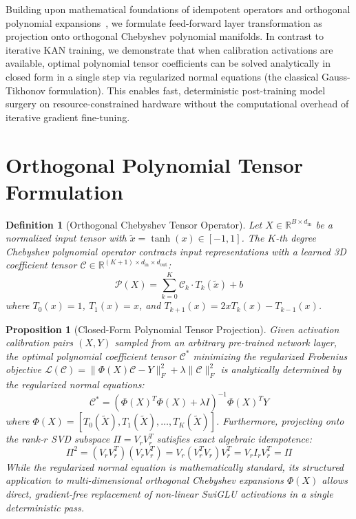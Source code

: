 \documentclass[journal,lettersize]{IEEEtran}
\newtheorem{definition}{Definition}
\newtheorem{proposition}{Proposition}
\begin{document}
Building upon mathematical foundations of idempotent operators and orthogonal polynomial expansions~\cite{mason2002chebyshev}, we formulate feed-forward layer transformation as projection onto orthogonal Chebyshev polynomial manifolds. In contrast to iterative KAN training, we demonstrate that when calibration activations are available, optimal polynomial tensor coefficients can be solved analytically in closed form in a single step via regularized normal equations (the classical Gauss-Tikhonov formulation). This enables fast, deterministic post-training model surgery on resource-constrained hardware without the computational overhead of iterative gradient fine-tuning.

\section{Orthogonal Polynomial Tensor Formulation}
\begin{definition}[Orthogonal Chebyshev Tensor Operator]
Let $X \in \mathbb{R}^{B \times d_{\text{in}}}$ be a normalized input tensor with $\tilde{x} = \tanh(x) \in [-1, 1]$. The $K$-th degree Chebyshev polynomial operator contracts input representations with a learned 3D coefficient tensor $\mathcal{C} \in \mathbb{R}^{(K+1) \times d_{\text{in}} \times d_{\text{out}}}$:
\begin{equation}
\mathcal{P}(X) = \sum_{k=0}^K \mathcal{C}_k \cdot T_k(\tilde{x}) + b
\end{equation}
where $T_0(x) = 1$, $T_1(x) = x$, and $T_{k+1}(x) = 2x T_k(x) - T_{k-1}(x)$.
\end{definition}

\begin{proposition}[Closed-Form Polynomial Tensor Projection]
Given activation calibration pairs $(X, Y)$ sampled from an arbitrary pre-trained network layer, the optimal polynomial coefficient tensor $\mathcal{C}^*$ minimizing the regularized Frobenius objective $\mathcal{L}(\mathcal{C}) = \|\Phi(X)\mathcal{C} - Y\|_F^2 + \lambda \|\mathcal{C}\|_F^2$ is analytically determined by the regularized normal equations:
\begin{equation}
\mathcal{C}^* = (\Phi(X)^T \Phi(X) + \lambda I)^{-1} \Phi(X)^T Y
\end{equation}
where $\Phi(X) = [T_0(\tilde{X}), T_1(\tilde{X}), \dots, T_K(\tilde{X})]$. Furthermore, projecting onto the rank-$r$ SVD subspace $\Pi = V_r V_r^T$ satisfies exact algebraic idempotence:
\begin{equation}
\Pi^2 = (V_r V_r^T)(V_r V_r^T) = V_r (V_r^T V_r) V_r^T = V_r I_r V_r^T = \Pi
\end{equation}
While the regularized normal equation is mathematically standard, its structured application to multi-dimensional orthogonal Chebyshev expansions $\Phi(X)$ allows direct, gradient-free replacement of non-linear SwiGLU activations in a single deterministic pass.
\end{proposition}
\end{document}
